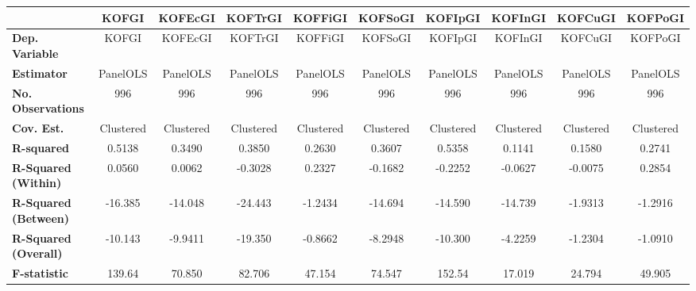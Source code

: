 \begin{center}
\begin{tabular}{lccccccccc}
\toprule
                                   & \textbf{KOFGI} & \textbf{KOFEcGI} & \textbf{KOFTrGI} & \textbf{KOFFiGI} & \textbf{KOFSoGI} & \textbf{KOFIpGI} & \textbf{KOFInGI} & \textbf{KOFCuGI} & \textbf{KOFPoGI}  \\
\midrule
\textbf{Dep. Variable}             &     KOFGI      &     KOFEcGI      &     KOFTrGI      &     KOFFiGI      &     KOFSoGI      &     KOFIpGI      &     KOFInGI      &     KOFCuGI      &     KOFPoGI       \\
\textbf{Estimator}                 &    PanelOLS    &     PanelOLS     &     PanelOLS     &     PanelOLS     &     PanelOLS     &     PanelOLS     &     PanelOLS     &     PanelOLS     &     PanelOLS      \\
\textbf{No. Observations}          &      996       &       996        &       996        &       996        &       996        &       996        &       996        &       996        &       996         \\
\textbf{Cov. Est.}                 &   Clustered    &    Clustered     &    Clustered     &    Clustered     &    Clustered     &    Clustered     &    Clustered     &    Clustered     &    Clustered      \\
\textbf{R-squared}                 &     0.5138     &      0.3490      &      0.3850      &      0.2630      &      0.3607      &      0.5358      &      0.1141      &      0.1580      &      0.2741       \\
\textbf{R-Squared (Within)}        &     0.0560     &      0.0062      &     -0.3028      &      0.2327      &     -0.1682      &     -0.2252      &     -0.0627      &     -0.0075      &      0.2854       \\
\textbf{R-Squared (Between)}       &    -16.385     &     -14.048      &     -24.443      &     -1.2434      &     -14.694      &     -14.590      &     -14.739      &     -1.9313      &     -1.2916       \\
\textbf{R-Squared (Overall)}       &    -10.143     &     -9.9411      &     -19.350      &     -0.8662      &     -8.2948      &     -10.300      &     -4.2259      &     -1.2304      &     -1.0910       \\
\textbf{F-statistic}               &     139.64     &      70.850      &      82.706      &      47.154      &      74.547      &      152.54      &      17.019      &      24.794      &      49.905       \\

\end{tabular}
\end{center}
